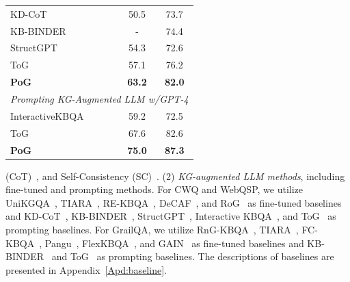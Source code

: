 \documentclass{article}
\begin{document}
\begin{table}
{\begin{tabular}{lcc}
KD-CoT~\cite{wang2023knowledge}& 50.5 &73.7 \\
KB-BINDER~\cite{li2023few}&-&74.4\\
StructGPT~\cite{jiang2023structgpt} & 54.3 & 72.6\\
ToG~\cite{sun2024think}& 57.1&76.2\\
\textbf{PoG}& \textbf{63.2} &  \textbf{82.0}   \\
\midrule
\multicolumn{3}{c}{\textit{Prompting KG-Augmented LLM w/GPT-4}}\\
\midrule
InteractiveKBQA~\cite{xiong2024interactive} & 59.2 &72.5\\
ToG~\cite{sun2024think} & 67.6 &82.6 \\
\textbf{PoG}   & \textbf{75.0} &\textbf{87.3}                     \\ \bottomrule
\end{tabular}}
\end{table}(CoT)~\cite{wei2022chain},
and Self-Consistency (SC)~\cite{wang2023self}. 
(2) \textit{KG-augmented LLM methods}, including fine-tuned and prompting methods. 
For CWQ and WebQSP, we utilize UniKGQA~\cite{jiang2023unikgqa}, TIARA~\cite{shu2022tiara}, RE-KBQA~\cite{cao2023pay}, DeCAF~\cite{yu2023decaf}, and RoG~\cite{luo2024reasoning} as fine-tuned baselines and KD-CoT~\cite{wang2023knowledge}, KB-BINDER~\cite{li2023few}, StructGPT~\cite{jiang2023structgpt}, Interactive KBQA~\cite{xiong2024interactive}, and ToG~\cite{sun2024think} as prompting baselines. For GrailQA, we utilize RnG-KBQA~\cite{ye2022rng}, TIARA~\cite{shu2022tiara}, FC-KBQA~\cite{zhang2023fc}, Pangu~\cite{gu2023don}, FlexKBQA~\cite{li2024flexkbqa}, and GAIN~\cite{shu2024distribution} as fine-tuned baselines and KB-BINDER~\cite{li2023few} and ToG~\cite{sun2024think} as prompting baselines.
The descriptions of baselines are presented in Appendix~\ref{Apd:baseline}.

\end{document}
